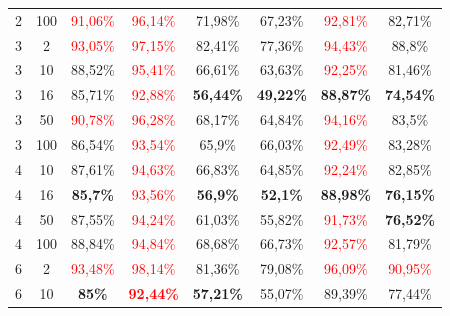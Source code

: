 \begin{table}[ht]
\begin{tabular}{cc|c|c|c|c|c|c}
        {2} & {100} & \textcolor{red}{91,06\%} & \textcolor{red}{96,14\%}          & {71,98\%}                & {67,23\%}                & \textcolor{red}{92,81\%} & {82,71\%}                \\
        {3} & {2}   & \textcolor{red}{93,05\%} & \textcolor{red}{97,15\%}          & {82,41\%}                & {77,36\%}                & \textcolor{red}{94,43\%} & {88,8\%}                 \\
        {3} & {10}  & {88,52\%}                & \textcolor{red}{95,41\%}          & {66,61\%}                & {63,63\%}                & \textcolor{red}{92,25\%} & {81,46\%}                \\
        {3} & {16}  & {85,71\%}                & \textcolor{red}{92,88\%}          & \textbf{56,44\%}         & \textbf{49,22\%}         & \textbf{88,87\%}         & \textbf{74,54\%}         \\
        {3} & {50}  & \textcolor{red}{90,78\%} & \textcolor{red}{96,28\%}          & {68,17\%}                & {64,84\%}                & \textcolor{red}{94,16\%} & {83,5\%}                 \\
        {3} & {100} & {86,54\%}                & \textcolor{red}{93,54\%}          & {65,9\%}                 & {66,03\%}                & \textcolor{red}{92,49\%} & {83,28\%}                \\
        {4} & {10}  & {87,61\%}                & \textcolor{red}{94,63\%}          & {66,83\%}                & {64,85\%}                & \textcolor{red}{92,24\%} & {82,85\%}                \\
        {4} & {16}  & \textbf{85,7\%}          & \textcolor{red}{93,56\%}          & \textbf{56,9\%}          & \textbf{52,1\%}          & \textbf{88,98\%}         & \textbf{76,15\%}         \\
        {4} & {50}  & {87,55\%}                & \textcolor{red}{94,24\%}          & {61,03\%}                & {55,82\%}                & \textcolor{red}{91,73\%} & \textbf{76,52\%}         \\
        {4} & {100} & {88,84\%}                & \textcolor{red}{94,84\%}          & {68,68\%}                & {66,73\%}                & \textcolor{red}{92,57\%} & {81,79\%}                \\
        {6} & {2}   & \textcolor{red}{93,48\%} & \textcolor{red}{98,14\%}          & {81,36\%}                & {79,08\%}                & \textcolor{red}{96,09\%} & \textcolor{red}{90,95\%} \\
        {6} & {10}  & \textbf{85\%}            & \textcolor{red}{\textbf{92,44\%}} & \textbf{57,21\%}         & {55,07\%}                & {89,39\%}                & {77,44\%}                \\

\end{tabular}
\end{table}
